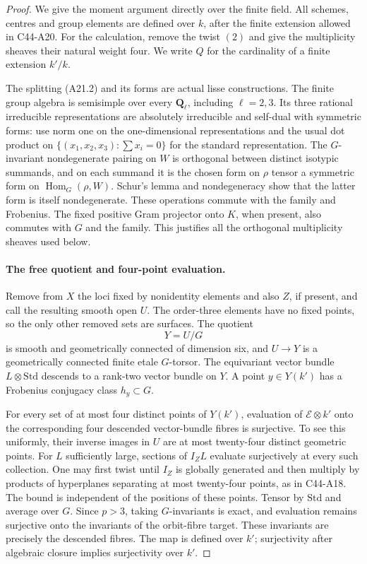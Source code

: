 \documentclass[11pt]{article}
\theoremstyle{remark}\newtheorem{remark}[theorem]{Remark}
\begin{document}
\begin{proof}
We give the moment argument directly over the finite field.  All schemes,
centres and group elements are defined over $k$, after the finite extension
allowed in C44-A20.  For the calculation, remove the twist $(2)$ and give
the multiplicity sheaves their natural weight four.  We write $Q$ for the
cardinality of a finite extension $k'/k$.

The splitting (A21.2) and its forms are actual lisse constructions.
The finite group algebra is semisimple over every $\mathbf Q_\ell$,
including $\ell=2,3$.  Its three rational irreducible representations are
absolutely irreducible and self-dual with symmetric forms: use norm one
on the one-dimensional representations and the usual dot product on
$\{(x_1,x_2,x_3):\sum x_i=0\}$ for the standard representation.
The $G$-invariant nondegenerate pairing on $W$ is orthogonal between
distinct isotypic summands, and on each summand it is the chosen form
on $\rho$ tensor a symmetric form on $\operatorname{Hom}_G(\rho,W)$.
Schur's lemma and nondegeneracy show that the latter form is itself
nondegenerate.  These operations commute with the family and Frobenius.
The fixed positive Gram projector onto $K$, when present, also commutes
with $G$ and the family.  This justifies all the orthogonal multiplicity
sheaves used below.

\paragraph{The free quotient and four-point evaluation.}
Remove from $X$ the loci fixed by nonidentity elements and also $Z$, if
present, and call the resulting smooth open $U$.  The order-three elements
have no fixed points, so the only other removed sets are surfaces.  The
quotient
\[
                            Y=U/G                               \tag{A21.3}
\]
is smooth and geometrically connected of dimension six, and $U\to Y$ is
a geometrically connected finite etale $G$-torsor.  The equivariant vector
bundle $L\otimes\mathrm{Std}$ descends to a rank-two vector bundle on $Y$.
A point $y\in Y(k')$ has a Frobenius conjugacy class $h_y\subset G$.

For every set of at most four distinct points of $Y(k')$, evaluation of
$\mathcal E\otimes k'$ onto the corresponding four descended vector-bundle
fibres is surjective.  To see this uniformly, their inverse images in $U$
are at most twenty-four distinct geometric points.  For $L$ sufficiently
large, sections of $I_ZL$ evaluate surjectively at every such collection.
One may first twist until $I_Z$ is globally generated and then multiply
by products of hyperplanes separating at most twenty-four points, as in
C44-A18.  The bound is independent of the positions of these points.
Tensor by $\mathrm{Std}$ and average over $G$.  Since $p>3$, taking
$G$-invariants is exact, and evaluation remains surjective onto the
invariants of the orbit-fibre target.  These invariants are precisely the
descended fibres.  The map is defined over $k'$; surjectivity after
algebraic closure implies surjectivity over $k'$.


\end{proof}
\end{document}

